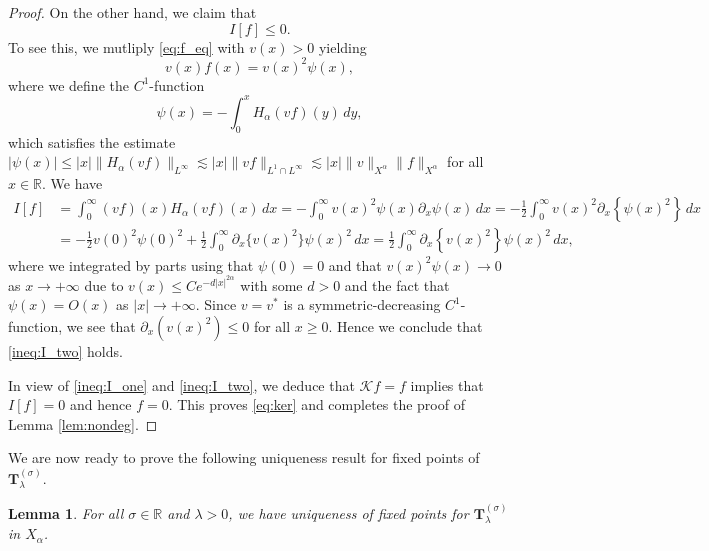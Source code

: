 \documentclass[reqno,10pt,a4paper]{amsart}
\newtheorem{lem}{Lemma}[section]
\theoremstyle{definition}
\theoremstyle{definition}
\theoremstyle{remark}
\theoremstyle{remark}
\numberwithin{equation}{section}
\newcommand{\R}{\mathbb{R}}
\newcommand{\pt}{\partial}
\newcommand{\be}{\begin{equation}}
\newcommand{\ee}{\end{equation}}
\newcommand{\Tss}{\mathbf{T}^{(\sigma)}_\lambda}
\begin{document}
\begin{proof}
On the other hand, we claim that
\be \label{ineq:I_two}
I[f] \leq 0.
\ee
To see this, we mutliply \eqref{eq:f_eq} with $v(x) > 0$ yielding
$$
v(x) f(x) = v(x)^2 \psi(x),
$$
where we define the $C^1$-function
$$
\psi(x) = -\int_0^x H_\alpha(vf)(y) \, dy,
$$
which satisfies the estimate $|\psi(x)| \leq |x| \| H_\alpha(vf) \|_{L^\infty} \lesssim |x| \| v f \|_{L^1 \cap L^\infty} \lesssim |x| \| v \|_{X^\alpha} \| f \|_{X^\alpha}$ for all $x \in \R$. We have
\begin{align*}
I[f] & = \int_0^\infty (v f)(x) H_\alpha(vf)(x) \, dx = -\int_0^\infty v(x)^2 \psi(x) \pt_x \psi(x) \, dx = -\frac{1}{2} \int_0^\infty v(x)^2 \pt_x \left \{ \psi(x)^2 \right\} \, dx \\
& = -\frac{1}{2} v(0)^2 \psi(0)^2 + \frac{1}{2} \int_0^\infty \pt_x \{ v(x)^2 \} \psi(x)^2 \, dx = \frac{1}{2} \int_0^\infty \pt_x \left \{ v(x)^2 \right \} \psi(x)^2 \, dx,
\end{align*}
where we integrated by parts using that $\psi(0)=0$ and that $v(x)^2 \psi(x) \to 0$ as $x \to +\infty$ due to $v(x) \leq C e^{-d|x|^{2 \alpha}}$ with some $d>0$ and the fact that $\psi(x) = O(x)$ as $|x| \to +\infty$. Since $v=v^*$ is a symmetric-decreasing $C^1$-function, we see that $\pt_x(v(x)^2) \leq 0$ for all $x \geq 0$. Hence we conclude that \eqref{ineq:I_two} holds.

In view of \eqref{ineq:I_one} and \eqref{ineq:I_two}, we deduce that $\mathcal{K} f = f$ implies that $I[f]=0$ and hence $f = 0$. This proves \eqref{eq:ker} and completes the proof of Lemma \ref{lem:nondeg}.
\end{proof}

We are now ready to prove the following uniqueness result for fixed points of  $\Tss$.

\begin{lem} \label{lem:unique}
For all $\sigma \in \R$ and $\lambda >0$, we have uniqueness of fixed points for $\Tss$ in $X_\alpha$.
\end{lem}
\end{document}
